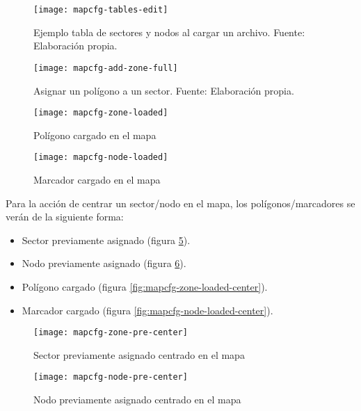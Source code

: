 \begin{figure}[H]
	\centering
	\texttt{[image: mapcfg-tables-edit]}
	\caption{\label{fig:mapcfg-tables-edit-exameple} Ejemplo tabla de sectores y nodos al cargar un archivo. Fuente: Elaboración propia.}
\end{figure}

\begin{figure}[H]
	\centering
	\texttt{[image: mapcfg-add-zone-full]}
	\caption{\label{fig:mapcfg-add-zone-full} Asignar un polígono a un sector. Fuente: Elaboración propia.}
\end{figure}

\begin{figure}[H]
	\centering
	\texttt{[image: mapcfg-zone-loaded]}
	\caption{\label{fig:mapcfg-zone-loaded} Polígono cargado en el mapa}
\end{figure}

\begin{figure}[H]
	\centering
	\texttt{[image: mapcfg-node-loaded]}
	\caption{\label{fig:mapcfg-node-loaded} Marcador cargado en el mapa}
\end{figure}

Para la acción de centrar un sector/nodo en el mapa, los polígonos/marcadores se verán de la siguiente forma:
\begin{itemize}
    \item Sector previamente asignado (figura \ref{fig:mapcfg-zone-pre-center}).
    \item Nodo previamente asignado (figura \ref{fig:mapcfg-node-pre-center}).
    \item Polígono cargado (figura \ref{fig:mapcfg-zone-loaded-center}).
    \item Marcador cargado (figura \ref{fig:mapcfg-node-loaded-center}).
\end{itemize}

\begin{figure}[H]
	\centering
	\texttt{[image: mapcfg-zone-pre-center]}
	\caption{\label{fig:mapcfg-zone-pre-center} Sector previamente asignado centrado en el mapa}
\end{figure}

\begin{figure}[H]
	\centering
	\texttt{[image: mapcfg-node-pre-center]}
	\caption{\label{fig:mapcfg-node-pre-center} Nodo previamente asignado centrado en el mapa}
\end{figure}

